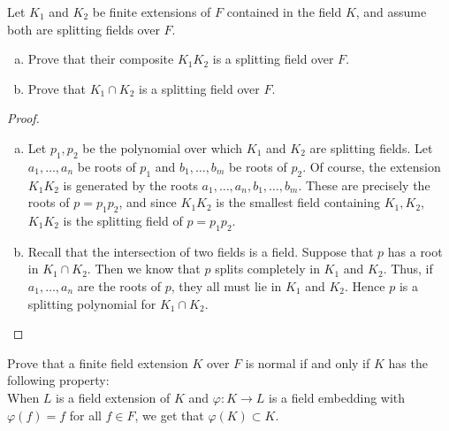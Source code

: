 \documentclass[num=7,duedate=03-24-21,course=Algebra\ II,proflastname=Walton]{hwtemplate}
\begin{document}
\problem[5]
\begin{claim} %
	Let \(K_1\) and \(K_2\) be finite extensions of \(F\) contained in the field \(K\), and assume both are splitting fields over \(F\).
	\begin{enumerate}[(a).]
		\item Prove that their composite \(K_1K_2\) is a splitting field over \(F\).
		\item Prove that \(K_1\cap K_2\) is a splitting field over \(F\).
	\end{enumerate}
\end{claim}
\begin{proof}
	\begin{enumerate}[(a).]
		\item Let \(p_1,p_2\) be the polynomial over which \(K_1\) and \(K_2\) are splitting fields. Let \(a_1,\ldots,a_n\) be roots of \(p_1\) and \(b_1,\ldots,b_m\) be roots of \(p_2\). Of course, the extension \(K_1K_2\) is generated by the roots \(a_1,\ldots,a_n,b_1,\ldots,b_m\). These are precisely the roots of \(p=p_1p_2\), and since \(K_1K_2\) is the smallest field containing \(K_1,K_2\), \(K_1K_2\) is the splitting field of \(p=p_1p_2\).
		\item Recall that the intersection of two fields is a field. Suppose that \(p\) has a root in \(K_1\cap K_2\). Then we know that \(p\) splits completely in \(K_1 \) and \(K_2\). Thus, if \(a_1,\ldots,a_n\) are the roots of \(p\), they all must lie in \(K_1\) and \(K_2\). Hence \(p\) is a splitting polynomial for \(K_1\cap K_2\).
	\end{enumerate}
\end{proof}

\problem[6]
\begin{claim}
	Prove that a finite field extension \(K\) over \(F\) is normal if and only if \(K\) has the following property:\\

	When \(L\) is a field extension of \(K\) and \(\varphi :K\to L\) is a field embedding with \(\varphi (f) = f\) for all \(f \in F\), we get that \(\varphi (K) \subset K\).
\end{claim}
\end{document}
